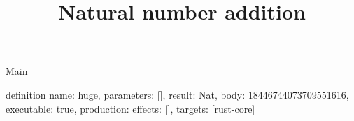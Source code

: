\begin{lexlean}{Main}
\title{Natural number addition}
\begin{semanticmodule}
definition{
  name: huge,
  parameters: [],
  result: Nat,
  body: 18446744073709551616,
  executable: true,
  production: {effects: [], targets: [rust-core]}
}
\end{semanticmodule}
\end{lexlean}
